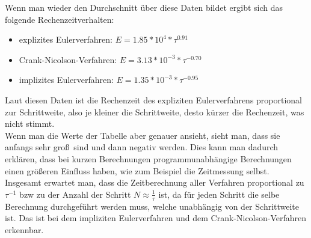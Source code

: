 \documentclass[11pt,a4paper]{article}
\begin{document}
Wenn man wieder den Durchschnitt \"uber diese Daten bildet ergibt sich das folgende Rechenzeitverhalten:
\begin{itemize}
\item explizites Eulerverfahren: $E = 1.85*10^4 * \tau^{ 0.91}$
\item Crank-Nicolson-Verfahren: $E = 3.13*10^{-3} * \tau^{-0.70}$
\item implizites Eulerverfahren: $E = 1.35*10^{-3} * \tau^{-0.95}$

\end{itemize}

Laut diesen Daten ist die Rechenzeit des expliziten Eulerverfahrens proportional zur Schrittweite, also je kleiner die Schrittweite, desto k\"urzer die Rechenzeit, was nicht stimmt.\\

 Wenn man die Werte der Tabelle aber genauer ansieht, sieht man, dass sie anfangs sehr gro\ss\ sind und dann negativ werden. Dies kann man dadurch erkl\"aren, dass bei kurzen Berechnungen programmunabh\"angige Berechnungen einen gr\"o\ss eren Einfluss haben, wie zum Beispiel die Zeitmessung selbst.\\
 
 Insgesamt erwartet man, dass die Zeitberechnung aller Verfahren proportional zu $\tau^{-1}$ bzw zu der Anzahl der Schritt $N\approx\frac{1}{\tau}$ ist, da f\"ur jeden Schritt die selbe Berechnung durchgef\"uhrt werden muss, welche unabh\"angig von der Schrittweite ist. Das ist bei dem impliziten Eulerverfahren und dem Crank-Nicolson-Verfahren erkennbar.\\
\end{document}

